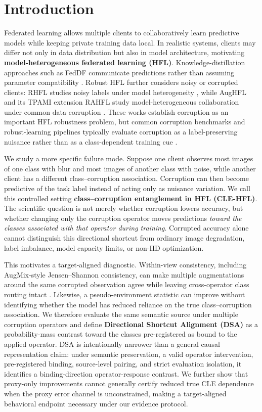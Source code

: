 \section{Introduction}

Federated learning allows multiple clients to collaboratively learn predictive models while keeping private training data local. In realistic systems, clients may differ not only in data distribution but also in model architecture, motivating \textbf{model-heterogeneous federated learning (HFL)}. Knowledge-distillation approaches such as FedDF communicate predictions rather than assuming parameter compatibility \citep{lin2020feddf}. Robust HFL further considers noisy or corrupted clients: RHFL studies noisy labels under model heterogeneity \citep{fang2022rhfl}, while AugHFL and its TPAMI extension RAHFL study model-heterogeneous collaboration under common data corruption \citep{fang2023aughfl,fang2025rahfl}. These works establish corruption as an important HFL robustness problem, but common corruption benchmarks and robust-learning pipelines typically evaluate corruption as a label-preserving nuisance rather than as a class-dependent training cue \citep{hendrycks2019corruptions,cubuk2020augmix}.

We study a more specific failure mode. Suppose one client observes most images of one class with blur and most images of another class with noise, while another client has a different class--corruption association. Corruption can then become predictive of the task label instead of acting only as nuisance variation. We call this controlled setting \textbf{class--corruption entanglement in HFL (CLE-HFL)}. The scientific question is not merely whether corruption lowers accuracy, but whether changing only the corruption operator moves predictions \emph{toward the classes associated with that operator during training}. Corrupted accuracy alone cannot distinguish this directional shortcut from ordinary image degradation, label imbalance, model capacity limits, or non-IID optimization.

This motivates a target-aligned diagnostic. Within-view consistency, including AugMix-style Jensen--Shannon consistency, can make multiple augmentations around the same corrupted observation agree while leaving cross-operator class routing intact \citep{cubuk2020augmix}. Likewise, a pseudo-environment statistic can improve without identifying whether the model has reduced reliance on the true class--corruption association. We therefore evaluate the same semantic source under multiple corruption operators and define \textbf{Directional Shortcut Alignment (DSA)} as a probability-mass contrast toward the classes pre-registered as bound to the applied operator. DSA is intentionally narrower than a general causal representation claim: under semantic preservation, a valid operator intervention, pre-registered binding, source-level pairing, and strict evaluation isolation, it identifies a binding-direction operator-response contrast. We further show that proxy-only improvements cannot generally certify reduced true CLE dependence when the proxy error channel is unconstrained, making a target-aligned behavioral endpoint necessary under our evidence protocol.

